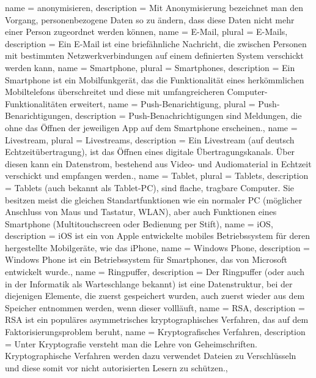 {
  name = anonymisieren,
  description = {Mit Anonymisierung bezeichnet man den Vorgang, personenbezogene Daten so zu ändern, dass diese Daten nicht mehr einer Person zugeordnet werden können},
}
{
  name = E-Mail,
  plural = E-Mails,
  description = {Ein E-Mail ist eine briefähnliche Nachricht, die zwischen Personen mit bestimmten Netzwerkverbindungen auf einem definierten System verschickt werden kann},
}
{
  name = Smartphone,
  plural = Smartphones,
  description = {Ein Smartphone ist ein Mobilfunkgerät, das die Funktionalität eines herkömmlichen Mobiltelefons überschreitet und diese mit umfangreicheren Computer-Funktionalitäten erweitert},
}
{
  name = Push-Benarichtigung,
  plural = Push-Benarichtigungen,
  description = {Push-Benachrichtigungen sind Meldungen, die ohne das Öffnen der jeweiligen \gls{App} auf dem \gls{Smartphone} erscheinen.},
}
{
  name = Livestream,
  plural = Livestreams,
  description = {Ein Livestream (auf deutsch Echtzeitübertragung), ist das Öffnen eines digitale Übertragungskanals. Über diesen kann ein Datenstrom, bestehend aus Video- und Audiomaterial in Echtzeit verschickt und empfangen werden.},
}
{
  name = Tablet,
  plural = Tablets,
  description = {Tablets (auch bekannt als Tablet-PC), sind flache, tragbare Computer. Sie besitzen meist die gleichen Standartfunktionen wie ein normaler PC (möglicher Anschluss von Maus und Tastatur, WLAN), aber auch Funktionen eines \gls{Smartphone} (Multitouchscreen oder Bedienung per Stift)},
}
{
  name = iOS,
  description = {iOS ist ein von Apple entwickelte mobiles Betriebssystem für deren hergestellte Mobilgeräte, wie das iPhone},
}
{
  name = Windows Phone,
  description = {Windows Phone ist ein Betriebssystem für Smartphones, das von Microsoft entwickelt wurde.},
}
{
  name = Ringpuffer,
  description = {Der Ringpuffer (oder auch in der Informatik als Warteschlange bekannt) ist eine Datenstruktur, bei der diejenigen Elemente, die zuerst gespeichert wurden, auch zuerst wieder aus dem Speicher entnommen werden, wenn dieser vollläuft},
}
{
  name = RSA,
  description = {RSA ist ein populäres asymmetrisches kryptographisches Verfahren, das auf dem Faktorisierungsproblem beruht},
}
{
  name = Kryptografisches Verfahren,
  description = {Unter Kryptografie versteht man die Lehre von Geheimschriften. Kryptographische Verfahren werden dazu verwendet Dateien zu Verschlüsseln und diese somit vor nicht autorisierten Lesern zu schützen.},
}
